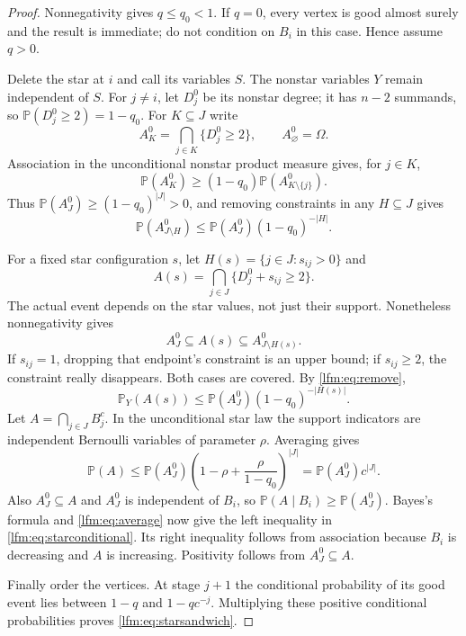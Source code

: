 \documentclass[11pt,letterpaper]{article}
\theoremstyle{remark}\newtheorem{remark}[theorem]{Remark}
\newcommand{\Prob}{\mathbb P}\newcommand{\E}{\mathbb E}
\begin{document}
\begin{proof}
Nonnegativity gives $q\le q_0<1$. If $q=0$, every vertex is good almost surely and the result is immediate; do not condition on $B_i$ in this case. Hence assume $q>0$.

Delete the star at $i$ and call its variables $S$. The nonstar variables $Y$ remain independent of $S$. For $j\ne i$, let $D_j^0$ be its nonstar degree; it has $n-2$ summands, so $\Prob(D_j^0\ge2)=1-q_0$. For $K\subseteq J$ write
\[
 A_K^0=\bigcap_{j\in K}\{D_j^0\ge2\},\qquad A_\varnothing^0=\Omega.
\]
Association in the unconditional nonstar product measure gives, for $j\in K$,
\[
 \Prob(A_K^0)\ge(1-q_0)\Prob(A_{K\setminus\{j\}}^0).
\]
Thus $\Prob(A_J^0)\ge(1-q_0)^{|J|}>0$, and removing constraints in any $H\subseteq J$ gives
\begin{equation}
 \Prob(A_{J\setminus H}^0)\le\Prob(A_J^0)(1-q_0)^{-|H|}.\label{lfm:eq:remove}
\end{equation}

For a fixed star configuration $s$, let $H(s)=\{j\in J:s_{ij}>0\}$ and
\[
 A(s)=\bigcap_{j\in J}\{D_j^0+s_{ij}\ge2\}.
\]
The actual event depends on the star values, not just their support. Nonetheless nonnegativity gives
\[
 A_J^0\subseteq A(s)\subseteq A_{J\setminus H(s)}^0.
\]
If $s_{ij}=1$, dropping that endpoint's constraint is an upper bound; if $s_{ij}\ge2$, the constraint really disappears. Both cases are covered. By \eqref{lfm:eq:remove},
\[
 \Prob_Y(A(s))\le\Prob(A_J^0)(1-q_0)^{-|H(s)|}.
\]
Let $A=\bigcap_{j\in J}B_j^c$. In the unconditional star law the support indicators are independent Bernoulli variables of parameter $\rho$. Averaging gives
\begin{equation}
 \Prob(A)\le\Prob(A_J^0)
 \left(1-\rho+\frac\rho{1-q_0}\right)^{|J|}
 =\Prob(A_J^0)c^{|J|}.\label{lfm:eq:average}
\end{equation}
Also $A_J^0\subseteq A$ and $A_J^0$ is independent of $B_i$, so
$\Prob(A\mid B_i)\ge\Prob(A_J^0)$. Bayes's formula and \eqref{lfm:eq:average} now give the left inequality in \eqref{lfm:eq:starconditional}. Its right inequality follows from association because $B_i$ is decreasing and $A$ is increasing. Positivity follows from $A_J^0\subseteq A$.

Finally order the vertices. At stage $j+1$ the conditional probability of its good event lies between $1-q$ and $1-qc^{-j}$. Multiplying these positive conditional probabilities proves \eqref{lfm:eq:starsandwich}.
\end{proof}
\end{document}
